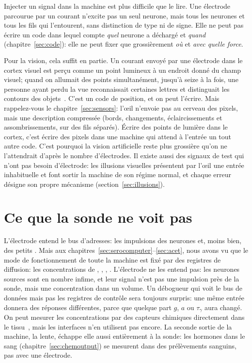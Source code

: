 Injecter un signal dans la machine est plus difficile que le lire. Une électrode parcourue par un courant n'excite pas un seul neurone, mais tous les neurones et tous les fils qui l'entourent, sans distinction de type ni de signe. Elle ne peut pas écrire un code dans lequel compte \emph{quel} neurone a déchargé et \emph{quand} (chapitre~\ref{sec:code}): elle ne peut fixer que grossièrement \emph{où} et \emph{avec quelle force}.

Pour la vision, cela suffit en partie. Un courant envoyé par une électrode dans le cortex visuel est perçu comme un point lumineux à un endroit donné du champ visuel; quand on allumait des points simultanément, jusqu'à seize à la fois, une personne ayant perdu la vue reconnaissait certaines lettres et distinguait les contours des objets~\cite{Fernandez2021}. C'est un code de position, et on peut l'écrire. Mais rappelez-vous le chapitre~\ref{sec:sensors}: l'œil n'envoie pas au cerveau des pixels, mais une description compressée (bords, changements, éclaircissements et assombrissements, sur des fils séparés). Écrire des \og points de lumière\fg{} dans le cortex, c'est écrire des pixels dans une machine qui attend à l'entrée un tout autre code. C'est pourquoi la vision artificielle reste plus grossière qu'on ne l'attendrait d'après le nombre d'électrodes. Il existe aussi des signaux de test qui n'ont pas besoin d'électrode: les illusions visuelles présentent par l'œil une entrée inhabituelle et font sortir la machine de son régime normal, et chaque erreur désigne son propre mécanisme (section~\ref{sec:illusions}).

\section{Ce que la sonde ne voit pas}

L'électrode entend le bus d'adresses: les impulsions des neurones  et, moins bien, des petits . Mais aux chapitres~\ref{sec:serocomputer}--\ref{sec:acet}, nous avons vu que le mode de fonctionnement de toute la machine est fixé par des registres de diffusion: les concentrations de , , , . L'électrode ne les entend pas: les neurones sources sont en nombre infime, et leur signal n'est pas une impulsion près de la sonde, mais une concentration dans un volume. Un débogueur qui voit le bus de données mais pas les registres de contrôle sera toujours surpris: une même entrée donnera des réponses différentes, parce que quelque part $g$, $a$ ou $\tau_\gamma$ aura changé. On peut mesurer les concentrations par des capteurs chimiques directement dans le tissu~\cite{Bunin1998}, mais les interfaces n'en utilisent pas encore. La seconde sortie de la machine, la lente, échappe elle aussi entièrement à la sonde: les hormones dans le sang (chapitre~\ref{sec:chemoutput}) se mesurent dans des prélèvements sanguins, pas avec une électrode.

